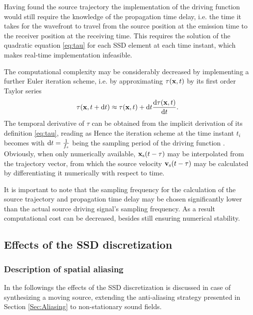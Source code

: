 Having found the source trajectory the implementation of the driving function would still require the knowledge of the propagation time delay, i.e. the time it takes for the wavefront to travel from the source position at the emission time to the receiver position at the receiving time.
This requires the solution of the quadratic equation \eqref{eq:tau} for each SSD element at each time instant, which makes real-time implementation infeasible.

The computational complexity may be considerably decreased by implementing a further Euler iteration scheme, i.e. by approximating $\tau(\mathbf{x},t)$ by its first order Taylor series
\begin{equation}
\tau(\mathbf{x},t+\mathrm{d} t) \approx \tau(\mathbf{x},t) + \mathrm{d} t \frac{\mathrm{d} \tau(\mathbf{x},t)}{\mathrm{d} t}.
\end{equation}
The temporal derivative of $\tau$ can be obtained from the implicit derivation of its definition \eqref{eq:tau}, reading as
Hence the iteration scheme at the time instant $t_i$ becomes
with $\mathrm{d} t = \frac{1}{f_s}$ being the sampling period of the driving function \cite{doi:10.1121/1.4996126}.
Obviously, when only numerically available, $\mathbf{x}_{\mathrm{s}}(t-\tau)$ may be interpolated from the trajectory vector, from which the source velocity $\mathbf{v}_{\mathrm{s}}(t-\tau)$ may be calculated by differentiating it numerically with respect to time.

It is important to note that the sampling frequency for the calculation of the source trajectory and propagation time delay may be chosen significantly lower than the actual source driving signal's sampling frequency.
As a result computational cost can be decreased, besides still ensuring numerical stability. 

\subsection{Effects of the SSD discretization}

\subsubsection{Description of spatial aliasing}

In the followings the effects of the SSD discretization is discussed in case of synthesizing a moving source, extending the anti-aliasing strategy presented in Section \ref{Sec:Aliasing} to non-stationary sound fields.

